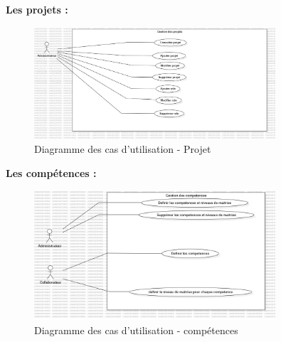 \documentclass{article}
\begin{document}
                \textbf{Les projets :}
                \begin{figure}[h!]
                    \centering
                    \includegraphics[width=0.8\textwidth]{assets/diagrammes/jpg/Model6!UseCaseProject_5.jpg}
                    \caption{Diagramme des cas d'utilisation - Projet}
                \end{figure}
                \FloatBarrier
                \newpage
                \textbf{Les compétences :}
                \begin{figure}[h!]
                    \centering
                    \includegraphics[width=0.8\textwidth]{assets/diagrammes/jpg/Model7!UseCaseSkills_6.jpg}
                    \caption{Diagramme des cas d'utilisation - compétences}
                \end{figure}
                \FloatBarrier
                \newpage
\end{document}
